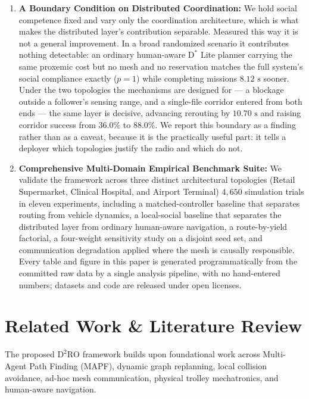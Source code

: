 \documentclass[journal]{IEEEtran}
\begin{document}
\begin{enumerate}
    \item \textbf{A Boundary Condition on Distributed Coordination:} We hold social competence fixed and vary only the coordination architecture, which is what makes the distributed layer's contribution separable. Measured this way it is not a general improvement. In a broad randomized scenario it contributes nothing detectable: an ordinary human-aware $\text{D}^*$ Lite planner carrying the same proxemic cost but no mesh and no reservation matches the full system's social compliance exactly ($p = 1$) while completing missions $8.12\text{ s}$ sooner. Under the two topologies the mechanisms are designed for --- a blockage outside a follower's sensing range, and a single-file corridor entered from both ends --- the same layer is decisive, advancing rerouting by $10.70\text{ s}$ and raising corridor success from $36.0\%$ to $88.0\%$. We report this boundary as a finding rather than as a caveat, because it is the practically useful part: it tells a deployer which topologies justify the radio and which do not.
    \item \textbf{Comprehensive Multi-Domain Empirical Benchmark Suite:} We validate the framework across three distinct architectural topologies (Retail Supermarket, Clinical Hospital, and Airport Terminal) $4{,}650$ simulation trials in eleven experiments, including a matched-controller baseline that separates routing from vehicle dynamics, a local-social baseline that separates the distributed layer from ordinary human-aware navigation, a route-by-yield factorial, a four-weight sensitivity study on a disjoint seed set, and communication degradation applied where the mesh is causally responsible. Every table and figure in this paper is generated programmatically from the committed raw data by a single analysis pipeline, with no hand-entered numbers; datasets and code are released under open licenses.
\end{enumerate}

\section{Related Work \& Literature Review}
The proposed $\text{D}^2\text{RO}$ framework builds upon foundational work across Multi-Agent Path Finding (MAPF), dynamic graph replanning, local collision avoidance, ad-hoc mesh communication, physical trolley mechatronics, and human-aware navigation.
\end{document}
